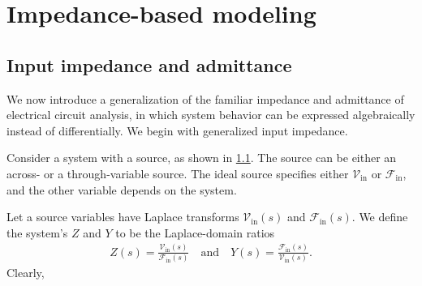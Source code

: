 \documentclass[dynamic_systems.tex]{subfiles}
\begin{document}
\chapter[Impedance-based modeling]{Impedance-based modeling}
\tags{}

\section{Input impedance and admittance}
\tags{}

We now introduce a generalization of the familiar impedance and admittance of electrical circuit analysis, in which system behavior can be expressed algebraically instead of differentially.
We begin with generalized input impedance.
\tags{}

\begin{figure}[b]
\centering
{}
\caption{}
\label{fig:system_impedance}
\end{figure}

Consider a system with a source, as shown in \cref{fig:system_impedance}.
The source can be either an across- or a through-variable source.
The ideal source specifies either $\mathcal{V}_\text{in}$ or $\mathcal{F}_\text{in}$, and the other variable depends on the system.
\tags{}

Let a source variables have Laplace transforms $\mathcal{V}_\text{in}(s)$ and $\mathcal{F}_\text{in}(s)$.
We define the system's  $Z$ and  $Y$ to be the Laplace-domain ratios
\begin{align}
	Z(s) = \frac{\mathcal{V}_\text{in}(s)}{\mathcal{F}_\text{in}(s)}
	\quad
	\text{and}
	\quad
	Y(s) = \frac{\mathcal{F}_\text{in}(s)}{\mathcal{V}_\text{in}(s)}.
\end{align}
Clearly,
\end{document}
